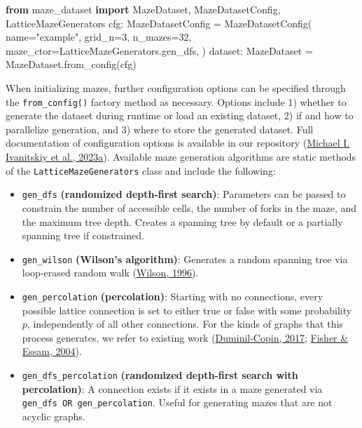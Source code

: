 \documentclass[10pt,a4paper,onecolumn]{article}
\newenvironment{Shaded}{}{}
\newcommand{\DecValTok}[1]{\textcolor[rgb]{0.25,0.63,0.44}{#1}}
\newcommand{\ImportTok}[1]{\textcolor[rgb]{0.00,0.50,0.00}{\textbf{#1}}}
\newcommand{\NormalTok}[1]{#1}
\newcommand{\OperatorTok}[1]{\textcolor[rgb]{0.40,0.40,0.40}{#1}}
\newcommand{\StringTok}[1]{\textcolor[rgb]{0.25,0.44,0.63}{#1}}
\providecommand{\tightlist}{%
  \setlength{\itemsep}{0pt}\setlength{\parskip}{0pt}}
\begin{document}
\begin{Shaded}
\begin{Highlighting}[]
\ImportTok{from}\NormalTok{ maze\_dataset }\ImportTok{import}\NormalTok{ MazeDataset, MazeDatasetConfig, LatticeMazeGenerators}
\NormalTok{cfg: MazeDatasetConfig }\OperatorTok{=}\NormalTok{ MazeDatasetConfig(}
\NormalTok{    name}\OperatorTok{=}\StringTok{"example"}\NormalTok{, }
\NormalTok{    grid\_n}\OperatorTok{=}\DecValTok{3}\NormalTok{, }
\NormalTok{    n\_mazes}\OperatorTok{=}\DecValTok{32}\NormalTok{, }
\NormalTok{    maze\_ctor}\OperatorTok{=}\NormalTok{LatticeMazeGenerators.gen\_dfs,}
\NormalTok{)}
\NormalTok{dataset: MazeDataset }\OperatorTok{=}\NormalTok{ MazeDataset.from\_config(cfg)}
\end{Highlighting}
\end{Shaded}

When initializing mazes, further configuration options can be specified
through the \texttt{from\_config()} factory method as necessary. Options
include 1) whether to generate the dataset during runtime or load an
existing dataset, 2) if and how to parallelize generation, and 3) where
to store the generated dataset. Full documentation of configuration
options is available in our repository
(\protect\hyperlink{ref-maze-dataset-github}{Michael I. Ivanitskiy et
al., 2023a}). Available maze generation algorithms are static methods of
the \texttt{LatticeMazeGenerators} class and include the following:

\begin{itemize}
\tightlist
\item
  \texttt{gen\_dfs} \textbf{(randomized depth-first search)}: Parameters
  can be passed to constrain the number of accessible cells, the number
  of forks in the maze, and the maximum tree depth. Creates a spanning
  tree by default or a partially spanning tree if constrained.
\item
  \texttt{gen\_wilson} \textbf{(Wilson's algorithm)}: Generates a random
  spanning tree via loop-erased random walk
  (\protect\hyperlink{ref-wilson}{Wilson, 1996}).
\item
  \texttt{gen\_percolation} \textbf{(percolation)}: Starting with no
  connections, every possible lattice connection is set to either true
  or false with some probability \(p\), independently of all other
  connections. For the kinds of graphs that this process generates, we
  refer to existing work
  (\protect\hyperlink{ref-percolation}{Duminil-Copin, 2017};
  \protect\hyperlink{ref-percolation-clustersize}{Fisher \& Essam,
  2004}).
\item
  \texttt{gen\_dfs\_percolation} \textbf{(randomized depth-first search
  with percolation)}: A connection exists if it exists in a maze
  generated via \texttt{gen\_dfs\ OR\ gen\_percolation}. Useful for
  generating mazes that are not acyclic graphs.
\end{itemize}
\end{document}

